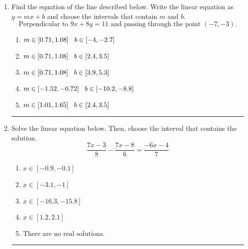 \documentclass[14pt]{extbook}
\newcommand{\litem}[1]{\item#1\hspace*{-1cm}\rule{\textwidth}{0.4pt}}
\begin{document}
\begin{enumerate}
{\begin{enumerate}[label=\Alph*.]
\end{enumerate} }
\litem{
Find the equation of the line described below. Write the linear equation as $ y=mx+b $ and choose the intervals that contain $m$ and $b$.\[ \text{Perpendicular to } 9 x + 8 y = 11 \text{ and passing through the point } (-7, -3). \]\begin{enumerate}[label=\Alph*.]
\item \( m \in [0.71, 1.08] \hspace*{3mm} b \in [-4, -2.7] \)
\item \( m \in [0.71, 1.08] \hspace*{3mm} b \in [2.4, 3.5] \)
\item \( m \in [0.71, 1.08] \hspace*{3mm} b \in [3.9, 5.3] \)
\item \( m \in [-1.52, -0.72] \hspace*{3mm} b \in [-10.2, -8.8] \)
\item \( m \in [1.01, 1.65] \hspace*{3mm} b \in [2.4, 3.5] \)

\end{enumerate} }
\litem{
Solve the linear equation below. Then, choose the interval that contains the solution.\[ \frac{7x -3}{8} - \frac{7x -8}{6} = \frac{-6x -4}{7} \]\begin{enumerate}[label=\Alph*.]
\item \( x \in [-0.9, -0.1] \)
\item \( x \in [-3.1, -1] \)
\item \( x \in [-16.3, -15.8] \)
\item \( x \in [1.2, 2.1] \)
\item \( \text{There are no real solutions.} \)

\end{enumerate} }
\end{enumerate}
\end{document}
